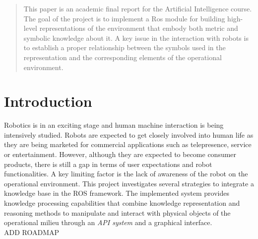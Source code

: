 \begin{abstract}
This paper is an academic final report for the Artificial Intelligence course. The goal of the project is to implement a Ros module for building high-level representations of the environment that embody both metric and symbolic knowledge about it. A key issue in the interaction with robots is to establish a proper relationship between the symbols used in the representation and the corresponding elements of the operational environment.
\end{abstract}	

\section{Introduction}

Robotics is in an exciting stage and human machine interaction is being intensively studied.
Robots are expected to get closely involved into human life as they are being marketed for commercial applications such as telepresence, service or entertainment. However, although they are expected to become consumer products, there is still a gap in terms of user expectations and robot functionalities. A key limiting factor is the lack of awareness of the robot on the operational environment.
This project investigates several strategies to integrate a knowledge base in the ROS framework. The implemented system provides knowledge processing capabilities that combine knowledge representation and reasoning methods to manipulate and interact with physical objects of the operational milieu through an \textit{API system} and a graphical interface.\\

ADD ROADMAP






